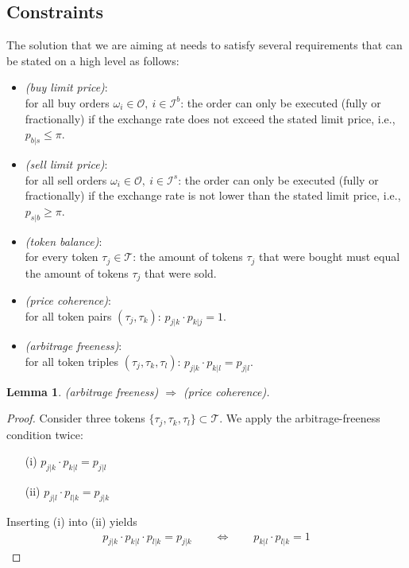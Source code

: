 \documentclass[11pt,parskip=full]{scrartcl}%
\newcommand*{\ie}{i.e., }
\newcommand*{\tokens}{\mathcal{T}}          %
\newcommand*{\orders}{\mathcal{O}}          %
\newcommand*{\ibuyorders}{\mathcal{I}^b}    %
\newcommand*{\isellorders}{\mathcal{I}^s}   %
\newtheorem{lemma}[theorem]{Lemma}
\begin{document}
\subsection{Constraints}
\label{subsec:constraints}

The solution that we are aiming at needs to satisfy several requirements that can be stated on a
high level as follows:
\begin{itemize}
  \item \emph{(buy limit price)}:\\
  for all buy orders $ \omega_i \in \orders, \> i \in \ibuyorders $:
  the order can only be executed (fully or fractionally) if the exchange rate does not exceed the
  stated limit price, \ie $ p_{b|s} \le \pi $.
  \item \emph{(sell limit price)}:\\
  for all sell orders $ \omega_i \in \orders, \> i \in \isellorders $:
  the order can only be executed (fully or fractionally) if the exchange rate is not lower than the
  stated limit price, \ie $ p_{s|b} \ge \pi $.
  \item \emph{(token balance)}:\\
  for every token $ \tau_j \in \tokens $: the amount of tokens $ \tau_j $ that were bought must
  equal the amount of tokens $ \tau_j $ that were sold.
  \item \emph{(price coherence)}:\\
  for all token pairs $ (\tau_j,\tau_k) $: $ p_{j|k} \cdot p_{k|j} = 1 $.
  \item \emph{(arbitrage freeness)}:\\
  for all token triples $ (\tau_j,\tau_k,\tau_l) $: $ p_{j|k} \cdot p_{k|l} = p_{j|l} $.
\end{itemize}

\vspace{.6cm}
\begin{lemma}
  (arbitrage freeness) $ \Rightarrow $ (price coherence).
\end{lemma}
\vspace{-.8cm}
\begin{proof}
  Consider three tokens $ \{\tau_j,\tau_k,\tau_l\} \subset \tokens $.
  We apply the arbitrage-freeness condition twice:
  \begin{itemize}
    \item[(i)] $ p_{j|k} \cdot p_{k|l} = p_{j|l} $
    \item[(ii)] $ p_{j|l} \cdot p_{l|k} = p_{j|k} $
  \end{itemize}
  Inserting (i) into (ii) yields
  \begin{align*}
    p_{j|k} \cdot p_{k|l} \cdot p_{l|k} = p_{j|k}
    \qquad \Leftrightarrow \qquad
    p_{k|l} \cdot p_{l|k} = 1
  \end{align*}
\end{proof}
\vspace{-.4cm}
\end{document}

